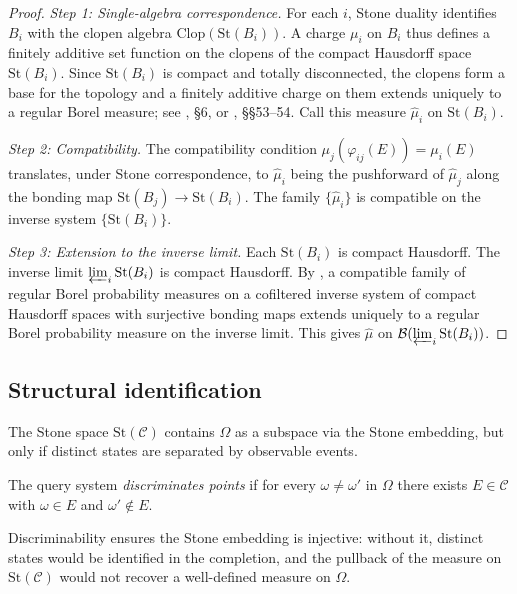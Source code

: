 \begin{proof}
\textit{Step 1: Single-algebra correspondence.}
For each $i$, Stone duality identifies $B_i$ with the clopen algebra $\mathrm{Clop}(\mathrm{St}(B_i))$.  A charge $\mu_i$ on $B_i$ thus defines a finitely additive set function on the clopens of the compact Hausdorff space $\mathrm{St}(B_i)$.  Since $\mathrm{St}(B_i)$ is compact and totally disconnected, the clopens form a base for the topology and a finitely additive charge on them extends uniquely to a regular Borel measure; see
\cite{cardona2025}, \S6, or \cite{Halmos1950}, \S\S53--54.  Call this measure
$\hat{\mu}_i$ on $\mathrm{St}(B_i)$.

\textit{Step 2: Compatibility.}
The compatibility condition $\mu_j(\varphi_{ij}(E)) = \mu_i(E)$ translates, under Stone correspondence, to $\hat{\mu}_i$ being the pushforward of $\hat{\mu}_j$ along the bonding map $\mathrm{St}(B_j) \to \mathrm{St}(B_i)$. The family $\{\hat{\mu}_i\}$ is compatible on the inverse system $\{\mathrm{St}(B_i)\}$.

\textit{Step 3: Extension to the inverse limit.}
Each $\mathrm{St}(B_i)$ is compact Hausdorff.  The inverse limit $\varprojlim_i \mathrm{St}(B_i)$ is compact Hausdorff.  By
\cite[Theorem~1]{choksi1958}, a compatible family of regular Borel probability
measures on a cofiltered inverse system of compact Hausdorff spaces with surjective bonding maps extends uniquely to a regular Borel probability measure on the inverse limit.  This gives $\hat{\mu}$ on $\mathcal{B}(\varprojlim_i \mathrm{St}(B_i))$.
\end{proof}

\subsection{Structural identification}
\label{sec:B1}

The Stone space $\mathrm{St}(\mathcal{C})$ contains $\Omega$ as a subspace via the Stone embedding, but only if distinct states are separated by observable events.

\begin{definition}[Discriminability]
\label{def:discriminability}
The query system \emph{discriminates points} if for every $\omega \neq \omega'$ in $\Omega$ there exists $E \in \mathcal{C}$ with $\omega \in E$ and $\omega' \notin E$.
\end{definition}

\noindent Discriminability ensures the Stone embedding is injective: without it, distinct states would be identified in the completion, and the pullback of the measure on $\mathrm{St}(\mathcal{C})$ would not recover a well-defined measure on $\Omega$.

